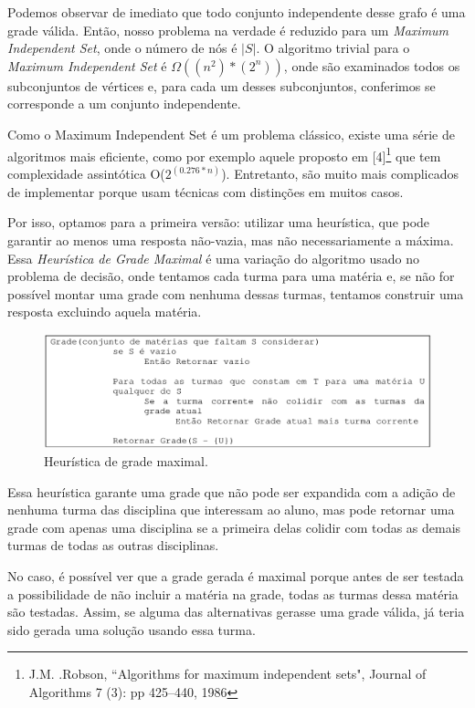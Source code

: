 \documentclass[graduacao,brazil]{ThesisPUC}
\begin{document}
Podemos observar de imediato que todo conjunto independente desse grafo é uma grade válida. Então, nosso problema na verdade é reduzido para um \textit{Maximum Independent Set}, onde o número de nós é $|S|$. O algoritmo trivial para o \textit{Maximum Independent Set} é $\Omega((n^2)*(2^n))$, onde são examinados todos os subconjuntos de vértices e, para cada um desses subconjuntos, conferimos se corresponde a um conjunto independente.

Como o Maximum Independent Set é um problema clássico, existe uma série de algoritmos mais eficiente, como por exemplo aquele proposto em [4]\footnote{J.M. .Robson, “Algorithms for maximum independent sets", Journal of Algorithms 7 (3): pp 425–440, 1986} que tem complexidade assintótica O($2^{(0.276*n)}$). Entretanto, são muito mais complicados de implementar porque usam técnicas com distinções em muitos casos.

Por isso, optamos para a primeira versão: utilizar uma heurística, que pode garantir ao menos uma resposta não-vazia, mas não necessariamente a máxima. Essa \textit{Heurística de Grade Maximal} é uma variação do algoritmo usado no problema de decisão, onde tentamos cada turma para uma matéria e, se não for possível montar uma grade com nenhuma dessas turmas, tentamos construir uma resposta excluindo aquela matéria.

\begin{figure}[H]
    \centering
    \includegraphics[width=\linewidth]{img/algoritmo_grade_maximal.png}
    \caption{Heurística de grade maximal.}
\end{figure}

Essa heurística garante uma grade que não pode ser expandida com a adição de nenhuma turma das disciplina que interessam ao aluno, mas pode retornar uma grade com apenas uma disciplina se a primeira delas colidir com todas as demais turmas de todas as outras disciplinas.

No caso, é possível ver que a grade gerada é maximal porque antes de ser testada a possibilidade de não incluir a matéria na grade, todas as turmas dessa matéria são testadas. Assim, se alguma das alternativas gerasse uma grade válida, já teria sido gerada uma solução usando essa turma.
\end{document}
